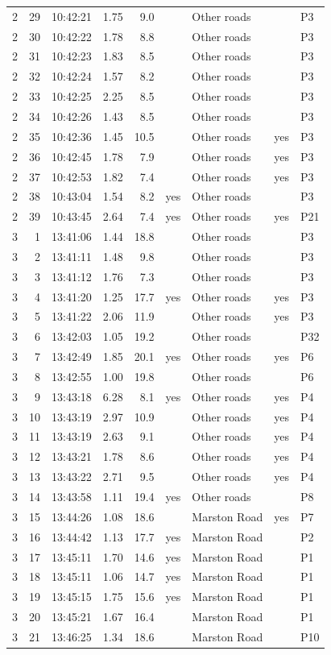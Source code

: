 \begin{longtable}{@{}rrlrrllll@{}}
2 & 29 & 10:42:21 & 1.75 & 9.0 &  & Other roads &  & P3 \\
2 & 30 & 10:42:22 & 1.78 & 8.8 &  & Other roads &  & P3 \\
2 & 31 & 10:42:23 & 1.83 & 8.5 &  & Other roads &  & P3 \\
2 & 32 & 10:42:24 & 1.57 & 8.2 &  & Other roads &  & P3 \\
2 & 33 & 10:42:25 & 2.25 & 8.5 &  & Other roads &  & P3 \\
2 & 34 & 10:42:26 & 1.43 & 8.5 &  & Other roads &  & P3 \\
2 & 35 & 10:42:36 & 1.45 & 10.5 &  & Other roads & yes & P3 \\
2 & 36 & 10:42:45 & 1.78 & 7.9 &  & Other roads & yes & P3 \\
2 & 37 & 10:42:53 & 1.82 & 7.4 &  & Other roads & yes & P3 \\
2 & 38 & 10:43:04 & 1.54 & 8.2 & yes & Other roads &  & P3 \\
2 & 39 & 10:43:45 & 2.64 & 7.4 & yes & Other roads & yes & P21 \\
\midrule
3 & 1 & 13:41:06 & 1.44 & 18.8 &  & Other roads &  & P3 \\
3 & 2 & 13:41:11 & 1.48 & 9.8 &  & Other roads &  & P3 \\
3 & 3 & 13:41:12 & 1.76 & 7.3 &  & Other roads &  & P3 \\
3 & 4 & 13:41:20 & 1.25 & 17.7 & yes & Other roads & yes & P3 \\
3 & 5 & 13:41:22 & 2.06 & 11.9 &  & Other roads & yes & P3 \\
3 & 6 & 13:42:03 & 1.05 & 19.2 &  & Other roads &  & P32 \\
3 & 7 & 13:42:49 & 1.85 & 20.1 & yes & Other roads & yes & P6 \\
3 & 8 & 13:42:55 & 1.00 & 19.8 &  & Other roads &  & P6 \\
3 & 9 & 13:43:18 & 6.28 & 8.1 & yes & Other roads & yes & P4 \\
3 & 10 & 13:43:19 & 2.97 & 10.9 &  & Other roads & yes & P4 \\
3 & 11 & 13:43:19 & 2.63 & 9.1 &  & Other roads & yes & P4 \\
3 & 12 & 13:43:21 & 1.78 & 8.6 &  & Other roads & yes & P4 \\
3 & 13 & 13:43:22 & 2.71 & 9.5 &  & Other roads & yes & P4 \\
3 & 14 & 13:43:58 & 1.11 & 19.4 & yes & Other roads &  & P8 \\
3 & 15 & 13:44:26 & 1.08 & 18.6 &  & Marston Road & yes & P7 \\
3 & 16 & 13:44:42 & 1.13 & 17.7 & yes & Marston Road &  & P2 \\
3 & 17 & 13:45:11 & 1.70 & 14.6 & yes & Marston Road &  & P1 \\
3 & 18 & 13:45:11 & 1.06 & 14.7 & yes & Marston Road &  & P1 \\
3 & 19 & 13:45:15 & 1.75 & 15.6 & yes & Marston Road &  & P1 \\
3 & 20 & 13:45:21 & 1.67 & 16.4 &  & Marston Road &  & P1 \\
3 & 21 & 13:46:25 & 1.34 & 18.6 &  & Marston Road &  & P10 \\
\end{longtable}
\endgroup
